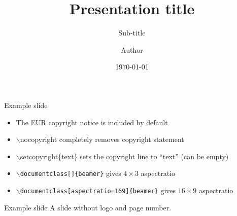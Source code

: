 \documentclass[aspectratio=169]{beamer}
\title{Presentation title}
\subtitle{Sub-title}
\author{Author}
\date{\today}
\begin{document}
\titlepage %




\begin{frame}{Example slide}
\begin{itemize}
	\item The EUR copyright notice is included by default
	\item $\backslash$nocopyright completely removes copyright statement
	\item $\backslash$setcopyright\{text\} sets the copyright line to ``text'' (can be empty)
	\item {\tt $\backslash$documentclass[]\{beamer\}} gives $4\times3$ aspectratio
	\item {\tt $\backslash$documentclass[aspectratio=169]\{beamer\}} gives $16\times9$ aspectratio	
\end{itemize}

\end{frame}

\begin{frame}{Example slide}\thispagestyle{empty}
	A slide without logo and page number.
\end{frame}


\end{document}
